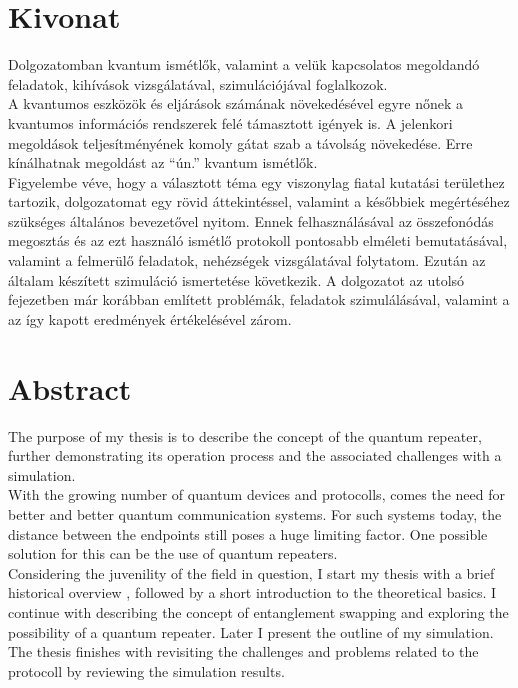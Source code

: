 
\chapter*{Kivonat}

Dolgozatomban kvantum ismétlők, valamint a velük kapcsolatos megoldandó feladatok, kihívások vizsgálatával, szimulációjával foglalkozok. \\
A kvantumos eszközök és eljárások számának növekedésével egyre nőnek a kvantumos információs rendszerek felé támasztott igények is. A jelenkori megoldások teljesítményének komoly gátat szab a távolság növekedése. Erre kínálhatnak megoldást az ``ún.'' kvantum ismétlők.\\
Figyelembe véve, hogy a választott téma egy viszonylag fiatal kutatási területhez tartozik, dolgozatomat egy rövid áttekintéssel, valamint a későbbiek megértéséhez szükséges általános bevezetővel nyitom. Ennek felhasználásával az összefonódás megosztás és az ezt használó ismétlő protokoll pontosabb elméleti bemutatásával, valamint a felmerülő feladatok, nehézségek vizsgálatával folytatom.  Ezután az általam készített szimuláció ismertetése következik. A dolgozatot az utolsó fejezetben már korábban említett problémák, feladatok szimulálásával, valamint a az így kapott eredmények értékelésével zárom.
\vfill

\chapter*{Abstract}
The purpose of my thesis is to describe the concept of the quantum repeater, further demonstrating its operation process and the associated challenges with a simulation.\\
With the growing number of quantum devices and protocolls, comes the need for better and better quantum communication systems. For such systems today, the distance between the endpoints still poses a huge limiting factor. One possible solution for this can be the use of quantum repeaters.\\
Considering the juvenility of the field in question, I start my thesis with a brief historical overview , followed by a short introduction to the theoretical basics. I continue with describing the concept of entanglement swapping and exploring the possibility of a quantum repeater. Later I present the outline of my simulation. The thesis finishes with revisiting the challenges and problems related to the protocoll by reviewing the simulation results.
\vfill